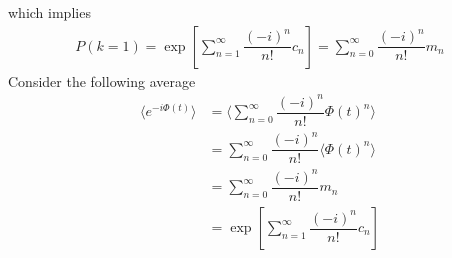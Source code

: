 \documentclass[aps,prb,onecolumn,notitlepage,showpacs,floatfix,superscriptaddress]{revtex4-1}
\begin{document}
which implies
\begin{equation}
\begin{split}
P(k=1) = \exp \left[ \sum_{n=1}^{\infty} \dfrac{(-i )^n}{n!} c_n \right] = \sum_{n=0}^{\infty} \dfrac{(-i )^n}{n!} m_n 
\end{split}
\end{equation}
Consider the following average
\begin{equation}
\begin{split}
\langle e^{-i \Phi(t)} \rangle &= \langle \sum_{n=0}^{\infty} \dfrac{(-i )^n}{n!} \Phi(t)^n \rangle \\
&=  \sum_{n=0}^{\infty} \dfrac{(-i )^n}{n!}  \langle\Phi(t)^n \rangle \\
&=  \sum_{n=0}^{\infty} \dfrac{(-i )^n}{n!} m_n \\
&= \exp \left[ \sum_{n=1}^{\infty} \dfrac{(-i )^n}{n!} c_n \right]
\end{split}
\end{equation}
\end{document}
